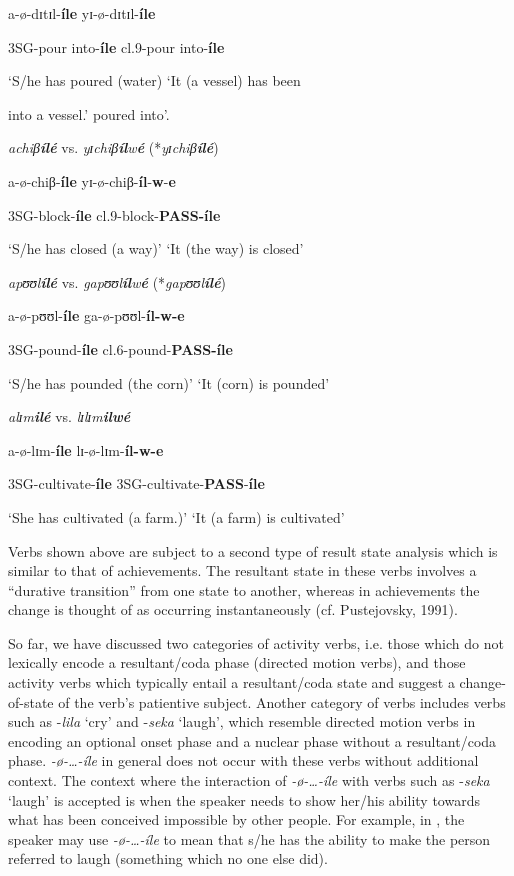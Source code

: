 \documentclass[output=paper]{langscibook}
\begin{document}
a-ø-dɪtɪl-\textbf{íle}      yɪ-ø-dɪtɪl-\textbf{íle}

3SG-pour into-\textbf{íle}    cl.9-pour into-\textbf{íle}


‘S/he has poured (water)   ‘It (a vessel) has been


                 into a vessel.’       poured into’.

\ex
\textit{achiβ}\textbf{\textit{ílé}}      vs.  \textit{y}\textit{ɪchiβ}\textbf{\textit{íl}}\textit{w}\textbf{\textit{é}} (*\textit{yɪ}\textit{chiβ}\textbf{\textit{ílé}})

    a-ø-chiβ-\textbf{íle}      yɪ-ø-chiβ-\textbf{íl}-\textbf{w}-\textbf{e}

    3SG-block-\textbf{íle}      cl.9-block-\textbf{PASS-íle}

    ‘S/he has closed (a way)’  ‘It (the way) is closed’

\ex *\textit{ap}\textit{ʊʊl}\textbf{\textit{ílé}}       vs.  \textit{gap}\textit{ʊʊl}\textbf{\textit{íl}}\textit{w}\textbf{\textit{é}} (*\textit{gap}\textit{ʊʊl}\textbf{\textit{ílé}})

    a-ø-pʊʊl-\textbf{íle}      ga-ø-pʊʊl-\textbf{íl-w-e}

    3SG-pound-\textbf{íle}      cl.6-pound-\textbf{PASS-íle}

    ‘S/he has pounded (the corn)’  ‘It (corn) is pounded’

\ex *\textit{alɪ}\textit{m}\textbf{\textit{ilé}}      vs.  \textit{lɪ}\textit{lɪ}\textit{m}\textbf{\textit{ilwé}}

a-ø-lɪm-\textbf{íle}        lɪ-ø-lɪm-\textbf{íl-w-e}

3SG-cultivate-\textbf{íle}      3SG-cultivate-\textbf{PASS}-\textbf{íle}

‘She has cultivated (a farm.)’  ‘It (a farm) is cultivated’
\z
\z

Verbs shown above are subject to a second type of result state analysis which is similar to that of achievements. The resultant state in these verbs involves a “durative transition” from one state to another, whereas in achievements the change is thought of as occurring instantaneously (cf. Pustejovsky, 1991).

So far, we have discussed two categories of activity verbs, i.e. those which do not lexically encode a resultant/coda phase (directed motion verbs), and those activity verbs which typically entail a resultant/coda state and suggest a change-of-state of the verb’s patientive subject. Another category of verbs includes verbs such as -\textit{lila} ‘cry’ and -\textit{seka} ‘laugh’, which resemble directed motion verbs in encoding an optional onset phase and a nuclear phase without a resultant/coda phase. \textit{-ø}\textit{-…-íle} in general does not occur with these verbs without additional context. The context where the interaction of \textit{-ø}\textit{-…-íle} with verbs such as -\textit{seka} ‘laugh’ is accepted is when the speaker needs to show her/his ability towards what has been conceived impossible by other people. For example, in , the speaker may use \textit{-ø}\textit{-…-íle} to mean that s/he has the ability to make the person referred to laugh (something which no one else did). 
\end{document}
